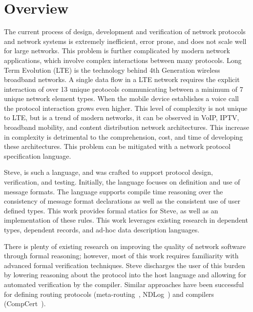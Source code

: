 \section{Overview}

The current process of design, development and verification of network protocols
and network systems is extremely inefficient, error prone, and does not scale
well for large networks. This problem is further complicated by modern network
applications, which
involve complex interactions between many protocols. Long Term
Evolution (LTE) is the technology behind 4th Generation wireless broadband
networks. A single data flow in a LTE network requires the explicit interaction
of over 13 unique protocols communicating between a minimum of 7 unique network
element types. When the mobile device establishes a voice call the protocol
interaction grows even higher. This level of complexity is not unique to LTE,
but is a trend of modern networks, it can be observed in VoIP, IPTV, broadband
mobility, and content distribution network architectures. This increase in
complexity is detrimental to the comprehension, cost, and time of developing
these architectures.
This problem can be mitigated with a network protocol specification language.

Steve, is such a language, and was crafted to support protocol design,
verification, and testing. Initially, the language focuses on definition and use
of message formats. The language supports compile time reasoning over the
consistency of message format declarations as well as the consistent use of
user defined types. This work provides formal statics for Steve, as
well as an implementation of these rules.
This work leverages existing research in dependent types, dependent records, and
ad-hoc data description languages.

There is plenty of existing research on improving the quality of network
software through formal reasoning; however, most of this work requires 
familiarity with advanced formal verification techniques. Steve discharges the
user of this burden by lowering reasoning about the protocol into the host 
language and allowing for automated verification by the compiler. Similar
approaches have been successful for defining routing protocols 
(meta-routing~\cite{meta_routing}, NDLog~\cite{ndlog}) and compilers
(CompCert~\cite{compcert}).
